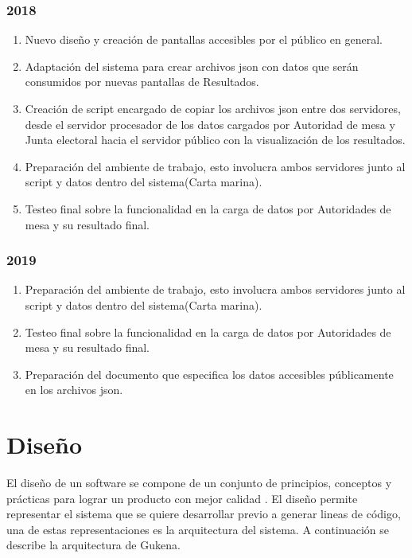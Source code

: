 \subsubsection{2018}
\begin{enumerate}
    \item Nuevo diseño y creación de pantallas accesibles por el público en general.
    \item Adaptación del sistema para crear archivos json con datos que serán consumidos por nuevas pantallas de Resultados.
    \item Creación de script encargado de copiar los archivos json entre dos servidores, desde el servidor procesador de los datos cargados por Autoridad de mesa y Junta electoral hacia el servidor público con la visualización de los resultados.
    \item Preparación del ambiente de trabajo, esto involucra ambos servidores junto al script y datos dentro del sistema(Carta marina).
    \item Testeo final sobre la funcionalidad en la carga de datos por Autoridades de mesa y su resultado final.
\end{enumerate}
\subsubsection{2019}
\begin{enumerate}
    \item Preparación del ambiente de trabajo, esto involucra ambos servidores junto al script y datos dentro del sistema(Carta marina).
    \item Testeo final sobre la funcionalidad en la carga de datos por Autoridades de mesa y su resultado final.
    \item Preparación del documento que especifica los datos accesibles públicamente en los archivos json.
\end{enumerate}

\section{Diseño}
El diseño de un software se compone de un conjunto de principios, conceptos y prácticas para lograr un producto con mejor calidad \cite{pressman1988ingenieria}. El diseño permite representar el sistema que se quiere desarrollar previo a generar lineas de código, una de estas representaciones es la arquitectura del sistema. A continuación se describe la arquitectura de Gukena. 

